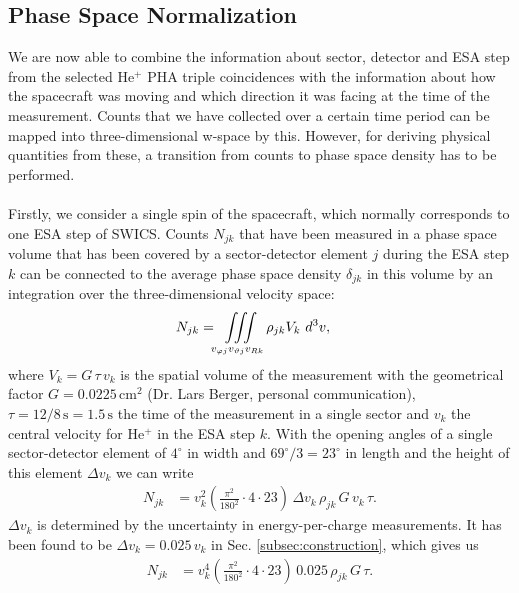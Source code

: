 \subsection{Phase Space Normalization}
We are now able to combine the information about sector, detector and ESA step from the selected $\mathrm{He^{+}}$ PHA triple coincidences with the information about how the spacecraft was moving and which direction it was facing at the time of the measurement.
Counts that we have collected over a certain time period can be mapped into three-dimensional w-space by this. However, for deriving physical quantities from these, a transition from counts to phase space density has to be performed.\\ \\
Firstly, we consider a single spin of the spacecraft, which normally corresponds to one ESA step of SWICS.
Counts $N_{jk}$ that have been measured in a phase space volume that has been covered by a sector-detector element $j$ during the ESA step $k$ can be connected to the average phase space density $\delta_{jk}$ in this volume by an integration over the three-dimensional velocity space:
\begin{align*}
N_{jk} &= \iiint\displaylimits_{v_{\varphi j}v_{\vartheta j}v_{R k}} \rho_{jk}	V_k	\,\,	d^3v,
\end{align*}
where $V_k = G \, \tau \, v_k$ is the spatial volume of the measurement with the geometrical factor $G = 0.0225 \,\mathrm{cm^2}$ (Dr. Lars Berger, personal communication), $\tau = 12/8\,\mathrm{s} = 1.5\,\mathrm{s}$ the time of the measurement in a single sector and $v_k$ the central velocity for $\mathrm{He^{+}}$ in the ESA step $k$.
With the opening angles of a single sector-detector element of $4^\circ$ in width and $69^\circ /3 = 23^\circ$ in length and the height of this element $\Delta v_k$ we can write
\begin{align*}
N_{jk} &= v^2_k \left(\frac{\pi^2}{180^2}\cdot4 \cdot 23\right) \, \Delta v_k \, \rho_{jk} \,	G \, v_k \, \tau.
\end{align*}
$\Delta v_k$ is determined by the uncertainty in energy-per-charge measurements. It has been found to be $\Delta v_k = 0.025 \, v_k$ in Sec. \ref{subsec:construction}, which gives us
\begin{align*}
N_{jk} &= v^4_k \left(\frac{\pi^2}{180^2}\cdot4 \cdot 23\right) \, 0.025\, \rho_{jk} \, G  \, \tau.
\end{align*}

